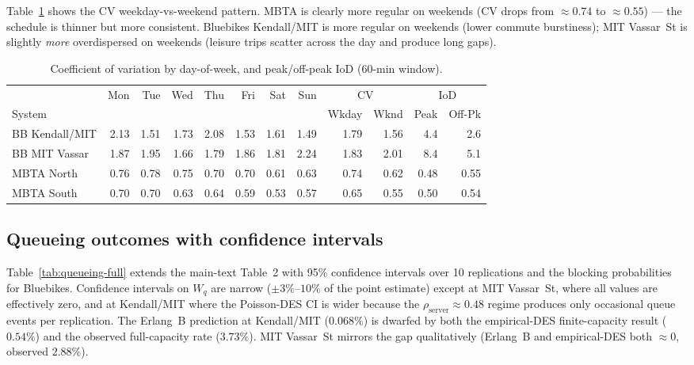 Table~\ref{tab:cv-dow} shows the $\mathrm{CV}$ weekday-vs-weekend pattern. MBTA is clearly more regular on weekends ($\mathrm{CV}$ drops from $\approx 0.74$ to $\approx 0.55$) --- the schedule is thinner but more consistent. Bluebikes Kendall/MIT is more regular on weekends (lower commute burstiness); MIT Vassar~St is slightly \emph{more} overdispersed on weekends (leisure trips scatter across the day and produce long gaps).

\begin{table}[h]
\centering
\caption{Coefficient of variation by day-of-week, and peak/off-peak IoD (60-min window).}
\label{tab:cv-dow}
\footnotesize
\begin{tabular}{@{}lrrrrrrr|rr|rr@{}}
\toprule
& Mon & Tue & Wed & Thu & Fri & Sat & Sun & \multicolumn{2}{c|}{CV} & \multicolumn{2}{c}{IoD} \\
System & & & & & & & & Wkday & Wknd & Peak & Off-Pk \\
\midrule
BB Kendall/MIT & 2.13 & 1.51 & 1.73 & 2.08 & 1.53 & 1.61 & 1.49 & 1.79 & 1.56 & 4.4 & 2.6 \\
BB MIT Vassar  & 1.87 & 1.95 & 1.66 & 1.79 & 1.86 & 1.81 & 2.24 & 1.83 & 2.01 & 8.4 & 5.1 \\
MBTA North     & 0.76 & 0.78 & 0.75 & 0.70 & 0.70 & 0.61 & 0.63 & 0.74 & 0.62 & 0.48 & 0.55 \\
MBTA South     & 0.70 & 0.70 & 0.63 & 0.64 & 0.59 & 0.53 & 0.57 & 0.65 & 0.55 & 0.50 & 0.54 \\
\bottomrule
\end{tabular}
\end{table}

\subsection{Queueing outcomes with confidence intervals}\label{app:queueing-full}

Table~\ref{tab:queueing-full} extends the main-text Table~2 with 95\% confidence intervals over 10 replications and the blocking probabilities for Bluebikes. Confidence intervals on $W_q$ are narrow ($\pm 3\%$--$10\%$ of the point estimate) except at MIT Vassar~St, where all values are effectively zero, and at Kendall/MIT where the Poisson-DES CI is wider because the $\rho_{\text{server}} \approx 0.48$ regime produces only occasional queue events per replication. The Erlang~B prediction at Kendall/MIT ($0.068\%$) is dwarfed by both the empirical-DES finite-capacity result ($0.54\%$) and the observed full-capacity rate ($3.73\%$). MIT Vassar~St mirrors the gap qualitatively (Erlang~B and empirical-DES both $\approx 0$, observed $2.88\%$).

